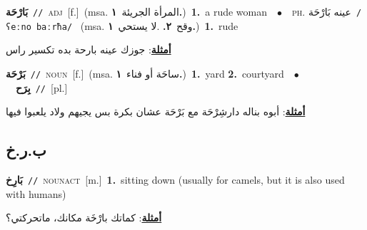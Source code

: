 \documentclass[10pt,a4paper,twoside]{article} %
\begin{document}
\begin{multicols}{2}
{\setlength\topsep{0pt}\textbf{\foreignlanguage{arabic}{بَارْحَة}}\ {\color{gray}\texttt{//}\color{black}}\ \textsc{adj}\ [f.]\ \color{gray}(msa. \foreignlanguage{arabic}{المرأة الجريئة}~\foreignlanguage{arabic}{\textbf{١.}})\color{black}\ \textbf{1.}~a rude woman\ \ $\bullet$\ \ \textsc{ph.} \color{gray} \foreignlanguage{arabic}{عينه بَارْحَة}\color{black}\ {\color{gray}\texttt{/{\sffamily ʕeːno baːrħa}/}\color{black}}\ \color{gray} (msa. \foreignlanguage{arabic}{وقح}~\foreignlanguage{arabic}{\textbf{٢.}}  .\foreignlanguage{arabic}{لا يستحي}~\foreignlanguage{arabic}{\textbf{١.}})\color{black}\ \textbf{1.}~rude\  \begin{flushright}\color{gray}\foreignlanguage{arabic}{\textbf{\underline{\foreignlanguage{arabic}{أمثلة}}}: جوزك عينه بارحة بده تكسير راس}\end{flushright}\color{black}} \vspace{2mm}

{\setlength\topsep{0pt}\textbf{\foreignlanguage{arabic}{بَرْحَة}}\ {\color{gray}\texttt{//}\color{black}}\ \textsc{noun}\ [f.]\ \color{gray}(msa. \foreignlanguage{arabic}{ساحَة أو فناء}~\foreignlanguage{arabic}{\textbf{١.}})\color{black}\ \textbf{1.}~yard  \textbf{2.}~courtyard\ \ $\bullet$\ \ \setlength\topsep{0pt}\textbf{\foreignlanguage{arabic}{بِرَح}}\ {\color{gray}\texttt{//}\color{black}}\ [pl.]\  \begin{flushright}\color{gray}\foreignlanguage{arabic}{\textbf{\underline{\foreignlanguage{arabic}{أمثلة}}}: أبوه بناله دارشِرْحَة مع بَرْحَة عشان بكرة بس يجيهم ولاد يلعبوا فيها}\end{flushright}\color{black}} \vspace{2mm}

\vspace{-3mm}
\subsection*{\color{blue}\foreignlanguage{arabic}{ب.ر.خ}\color{blue}{}} 

{\setlength\topsep{0pt}\textbf{\foreignlanguage{arabic}{بَارِخ}}\ {\color{gray}\texttt{//}\color{black}}\ \textsc{noun\textunderscore act}\ [m.]\ \textbf{1.}~sitting down (usually for camels, but it is also used with humans)\  \begin{flushright}\color{gray}\foreignlanguage{arabic}{\textbf{\underline{\foreignlanguage{arabic}{أمثلة}}}: كماتك بارْخَة مكانك، ماتحركتي؟}\end{flushright}\color{black}} \vspace{2mm}


\end{multicols}
\end{document}

